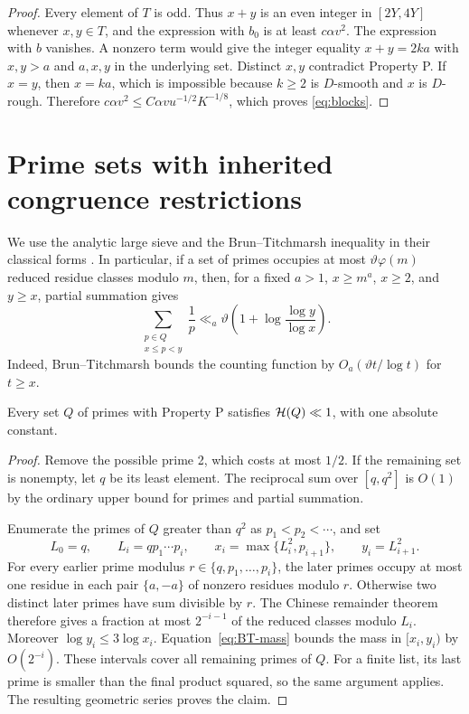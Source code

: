 \begin{proof}
Every element of \(T\) is odd. Thus \(x+y\) is an even
integer in \([2Y,4Y]\) whenever \(x,y\in T\), and the expression
with \(b_0\) is at least \(c\alpha v^2\).
The expression with \(b\) vanishes. A nonzero term would give
the integer equality \(x+y=2ka\) with \(x,y>a\) and \(a,x,y\)
in the underlying set. Distinct \(x,y\) contradict Property P.
If \(x=y\), then \(x=ka\), which is impossible because \(k\ge2\)
is \(D\)-smooth and \(x\) is \(D\)-rough. Therefore
\(
 c\alpha v^2\le C\alpha v u^{-1/2}K^{-1/8}
\),
which proves \eqref{eq:blocks}.
\end{proof}

\section{Prime sets with inherited congruence restrictions}\label{sec:prime-tail}

We use the analytic large sieve and the Brun--Titchmarsh
inequality in their classical forms \cite{MV,MVbook}. In
particular, if a set of primes occupies at most
\(\vartheta\varphi(m)\) reduced residue classes modulo \(m\),
then, for a fixed \(a>1\), \(x\ge m^a\), \(x\ge2\), and
\(y\ge x\), partial summation gives
\begin{equation}\label{eq:BT-mass}
 \sum_{\substack{p\in Q\\x\le p<y}}\frac1p
 \ll_a \vartheta
       \left(1+\log\frac{\log y}{\log x}\right).
\end{equation}
Indeed, Brun--Titchmarsh bounds the counting function by
\(O_a(\vartheta t/\log t)\) for \(t\ge x\).

\begin{lemma}\label{lem:prime-uniform}
Every set \(Q\) of primes with Property P satisfies
\(\mathcal H(Q)\ll1\), with one absolute constant.
\end{lemma}

\begin{proof}
Remove the possible prime 2, which costs at most \(1/2\).
If the remaining set is nonempty, let \(q\) be its least
element. The reciprocal sum over \([q,q^2]\) is \(O(1)\)
by the ordinary upper bound for primes and partial summation.

Enumerate the primes of \(Q\) greater than \(q^2\) as
\(p_1<p_2<\cdots\), and set
\[
 L_0=q,\qquad L_i=qp_1\cdots p_i,\qquad
 x_i=\max\{L_i^2,p_{i+1}\},\qquad y_i=L_{i+1}^2.
\]
For every earlier prime modulus \(r\in\{q,p_1,\ldots,p_i\}\),
the later primes occupy at most one residue in each pair
\(\{a,-a\}\) of nonzero residues modulo \(r\). Otherwise
two distinct later primes have sum divisible by \(r\).
The Chinese remainder theorem therefore gives a fraction
at most \(2^{-i-1}\) of the reduced classes modulo \(L_i\).
Moreover \(\log y_i\le3\log x_i\).
Equation~\eqref{eq:BT-mass} bounds the mass in
\([x_i,y_i)\) by \(O(2^{-i})\).
These intervals cover all remaining primes of \(Q\).
For a finite list, its last prime is smaller than the final
product squared, so the same argument applies.
The resulting geometric series proves the claim.
\end{proof}

